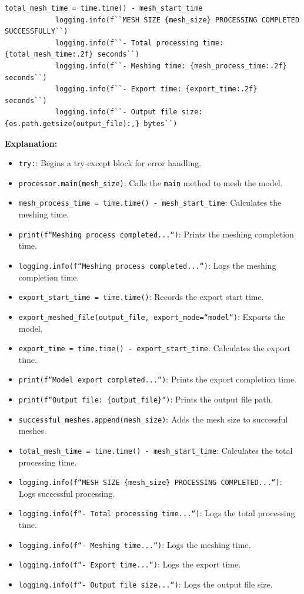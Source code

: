 \documentclass{book}
\begin{document}
\begin{itemize}[leftmargin=*,label=\textbullet]
\begin{lstlisting}[caption={Main Execution Block - Meshing and Export},label={lst:main_2}]
            total_mesh_time = time.time() - mesh_start_time
            logging.info(f``MESH SIZE {mesh_size} PROCESSING COMPLETED SUCCESSFULLY``)
            logging.info(f``- Total processing time: {total_mesh_time:.2f} seconds``)
            logging.info(f``- Meshing time: {mesh_process_time:.2f} seconds``)
            logging.info(f``- Export time: {export_time:.2f} seconds``)
            logging.info(f``- Output file size: {os.path.getsize(output_file):,} bytes``)
\end{lstlisting}
\textbf{Explanation:}
\begin{itemize}
    \item \texttt{try:}: Begins a try-except block for error handling.
    \item \texttt{processor.main(mesh\_size)}: Calls the \texttt{main} method to mesh the model.
    \item \texttt{mesh\_process\_time = time.time() - mesh\_start\_time}: Calculates the meshing time.
    \item \texttt{print(f``Meshing process completed...``)}: Prints the meshing completion time.
    \item \texttt{logging.info(f``Meshing process completed...``)}: Logs the meshing completion time.
    \item \texttt{export\_start\_time = time.time()}: Records the export start time.
    \item \texttt{export\_meshed\_file(output\_file, export\_mode=``model``)}: Exports the model.
    \item \texttt{export\_time = time.time() - export\_start\_time}: Calculates the export time.
    \item \texttt{print(f``Model export completed...``)}: Prints the export completion time.
    \item \texttt{print(f``Output file: \{output\_file\}``)}: Prints the output file path.
    \item \texttt{successful\_meshes.append(mesh\_size)}: Adds the mesh size to successful meshes.
    \item \texttt{total\_mesh\_time = time.time() - mesh\_start\_time}: Calculates the total processing time.
    \item \texttt{logging.info(f``MESH SIZE \{mesh\_size\} PROCESSING COMPLETED...``)}: Logs successful processing.
    \item \texttt{logging.info(f``- Total processing time...``)}: Logs the total processing time.
    \item \texttt{logging.info(f``- Meshing time...``)}: Logs the meshing time.
    \item \texttt{logging.info(f``- Export time...``)}: Logs the export time.
    \item \texttt{logging.info(f``- Output file size...``)}: Logs the output file size.
\end{itemize}


\end{itemize}
\end{document}
